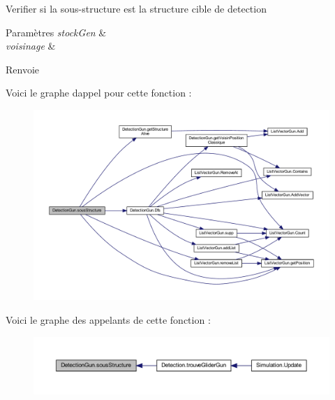 Verifier si la sous-\/structure est la structure cible de detection 


\begin{DoxyParams}{Paramètres}
{\em stock\+Gen} & \\
\hline
{\em voisinage} & \\
\hline
\end{DoxyParams}
\begin{DoxyReturn}{Renvoie}

\end{DoxyReturn}
Voici le graphe d\textquotesingle{}appel pour cette fonction \+:
\nopagebreak
\begin{figure}[H]
\begin{center}
\leavevmode
\includegraphics[width=350pt]{class_detection_gun_af804b47fcbcc2c89bbe17b47eb8f7c47_cgraph}
\end{center}
\end{figure}
Voici le graphe des appelants de cette fonction \+:
\nopagebreak
\begin{figure}[H]
\begin{center}
\leavevmode
\includegraphics[width=350pt]{class_detection_gun_af804b47fcbcc2c89bbe17b47eb8f7c47_icgraph}
\end{center}
\end{figure}
\mbox{\label{class_detection_gun_aaafe20e9ecbfe9e95e2f36ac49701d3d}} 
